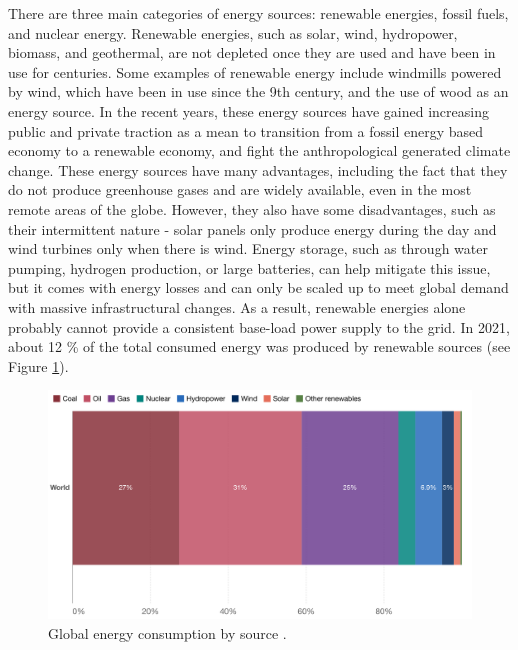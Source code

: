 \documentclass[my_thesis.tex]{subfiles}
\begin{document}
There are three main categories of energy sources: renewable energies, fossil fuels, and nuclear energy. Renewable energies, such as solar, wind, hydropower, biomass, and geothermal, are not depleted once they are used and have been in use for centuries. Some examples of renewable energy include windmills powered by wind, which have been in use since the 9th century, and the use of wood as an energy source. In the recent years, these energy sources have gained increasing public and private traction as a mean to transition from a fossil energy based economy to a renewable economy, and fight the anthropological generated climate change. These energy sources have many advantages, including the fact that they do not produce greenhouse gases and are widely available, even in the most remote areas of the globe. However, they also have some disadvantages, such as their intermittent nature - solar panels only produce energy during the day and wind turbines only when there is wind. Energy storage, such as through water pumping, hydrogen production, or large batteries, can help mitigate this issue, but it comes with energy losses and can only be scaled up to meet global demand with massive infrastructural changes. As a result, renewable energies alone probably cannot provide a consistent base-load power supply to the grid. In 2021, about 12 \% of the total consumed energy was produced by renewable sources (see Figure \ref{fig.energy consumption}).

\begin{figure}
    \centering
    \includegraphics[width=\linewidth]{images/primary-energy-source-bar.png}
    \caption{Global energy consumption by source \citep{ritchieWhichSourcesDoes2021}.}
    \label{fig.energy consumption}
\end{figure}
\end{document}
